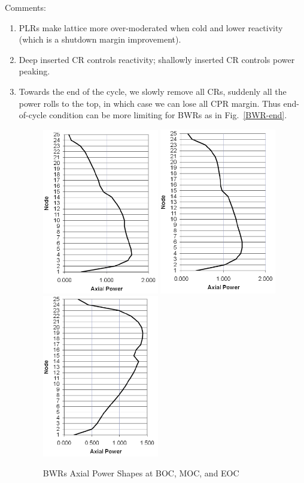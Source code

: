 \documentclass{school-22.211-notes}
\begin{document}
Comments:
\begin{enumerate}
\item PLRs make lattice more over-moderated when cold and lower reactivity (which is a shutdown margin improvement). 
\item Deep inserted CR controls reactivity; shallowly inserted CR controls power peaking. 
\item Towards the end of the cycle, we slowly remove all CRs, suddenly all the power rolls to the top, in which case we can lose all CPR margin. Thus end-of-cycle condition can be more limiting for BWRs as in Fig.~\ref{BWR-end}. 
  \begin{figure}[ht]
    \centering
    \includegraphics[width=2in]{images/design/BWR-BOC.png}
    \includegraphics[width=2in]{images/design/BWR-MOC.png}
    \includegraphics[width=2in]{images/design/BWR-EOC.png}
    \caption{BWRs Axial Power Shapes at BOC, MOC, and EOC} \label{BWR-cycle} 
    \end{figure}




\end{enumerate}
\end{document}

